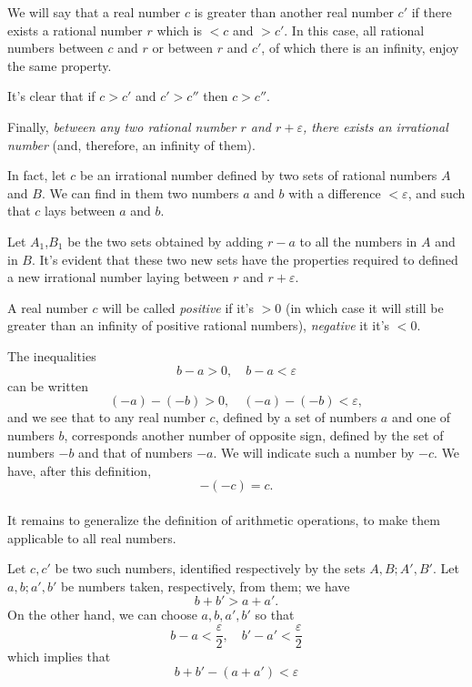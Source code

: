 \documentclass[10pt,letterpaper]{book}
\renewcommand\epsilon{\varepsilon}
\theoremstyle{definition}
\begin{document}
We will say that a real number $c$ is greater than another real number $c'$ if there exists a rational number $r$ which is $<c$ and $> c'$. In this case, all rational numbers between $c$ and $r$ or between $r$ and $c'$, of which there is an infinity, enjoy the same property.

It's clear that if $c> c'$ and $c' > c''$ then $c > c''$.

Finally, \textit{between any two rational number $r$ and $r+\epsilon$, there exists an irrational number} (and, therefore, an infinity of them).


In fact, let $c$ be an irrational number defined by two sets of rational numbers $A$ and $B$. We can find in them two numbers $a$ and $b$ with a difference $<\epsilon$, and such that $c$ lays between $a$ and $b$.

Let $A_1$,$B_1$ be the two sets obtained by adding $r-a$ to all the numbers in $A$ and in $B$. It's evident that these two new sets have the properties required to defined a new irrational number laying between $r$ and $r+\epsilon$.

A real number $c$ will be called \textit{positive} if it's $> 0$ (in which case it will still be greater than an infinity of positive rational numbers), \textit{negative} it it's $< 0$.

The inequalities
\[
  b-a > 0,\quad b-a < \epsilon
\]
can be written
\[
  (-a) - (-b) > 0,\quad (-a)-(-b) < \epsilon,
\]
and we see that to any real number $c$, defined by a set of numbers $a$ and one of numbers $b$, corresponds another number of opposite sign, defined by the set of numbers $-b$ and that of numbers $-a$. We will indicate such a number by $-c$. We have, after this definition,
\[
  -(-c) = c.
\]

\paragraph{} It remains to generalize the definition of arithmetic operations, to make them applicable to all real numbers.

Let $c, c'$ be two such numbers, identified respectively by the sets $A, B; A', B'$. Let $a,b;a', b'$ be numbers taken, respectively, from them; we have
\[
  b+b' > a+a'.
\]
On the other hand, we can choose $a,b,a',b'$ so that
\[
  b-a < \frac \epsilon 2,\quad b'-a' < \frac \epsilon 2
\]
which implies that
\[
  b + b' - (a + a')< \epsilon
\]

\end{document}
